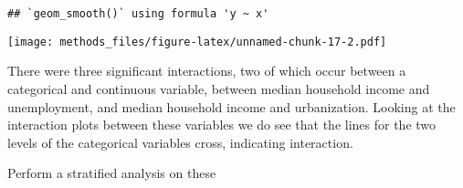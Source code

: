 \documentclass[
]{article}
\newenvironment{Shaded}{\begin{snugshade}}{\end{snugshade}}
\newcommand{\CommentTok}[1]{\textcolor[rgb]{0.56,0.35,0.01}{\textit{#1}}}
\newcommand{\DataTypeTok}[1]{\textcolor[rgb]{0.13,0.29,0.53}{#1}}
\newcommand{\KeywordTok}[1]{\textcolor[rgb]{0.13,0.29,0.53}{\textbf{#1}}}
\newcommand{\NormalTok}[1]{#1}
\newcommand{\OperatorTok}[1]{\textcolor[rgb]{0.81,0.36,0.00}{\textbf{#1}}}
\newcommand{\StringTok}[1]{\textcolor[rgb]{0.31,0.60,0.02}{#1}}
\begin{document}
\begin{verbatim}
## `geom_smooth()` using formula 'y ~ x'
\end{verbatim}

\texttt{[image: methods\_files/figure-latex/unnamed-chunk-17-2.pdf]}

There were three significant interactions, two of which occur between a
categorical and continuous variable, between median household income and
unemployment, and median household income and urbanization. Looking at
the interaction plots between these variables we do see that the lines
for the two levels of the categorical variables cross, indicating
interaction.

Perform a stratified analysis on these

\begin{Shaded}
\end{Shaded}
\end{document}
